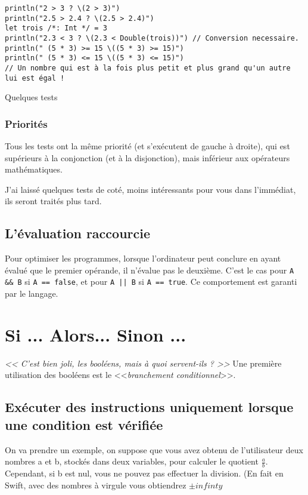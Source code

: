 \begin{listing}[h]
\begin{verbatim}
println("2 > 3 ? \(2 > 3)")
println("2.5 > 2.4 ? \(2.5 > 2.4)")
let trois /*: Int */ = 3
println("2.3 < 3 ? \(2.3 < Double(trois))") // Conversion necessaire.
println(" (5 * 3) >= 15 \((5 * 3) >= 15)")
println(" (5 * 3) <= 15 \((5 * 3) <= 15)")
// Un nombre qui est à la fois plus petit et plus grand qu'un autre lui est égal !

\end{verbatim}
\caption{Quelques tests}
\end{listing}%
\subsubsection{Priorités}
Tous les tests ont la même priorité
(et s'exécutent de gauche à droite),
qui est supérieurs à la conjonction (et à la disjonction),
mais inférieur aux opérateurs mathématiques.



J'ai laissé quelques tests de coté, moins intéressants pour vous dans l'immédiat, ils seront traités plus tard.
\subsection{L'évaluation raccourcie}
Pour optimiser les programmes, lorsque l'ordinateur peut conclure en ayant évalué que le premier opérande, il n'évalue pas le deuxième. C'est le cas pour \texttt{A && B} si \texttt{A == false},
et pour \texttt{A || B} si \texttt{A == true}.
Ce comportement est garanti par le langage.
\section{Si ... Alors... Sinon ...}
\emph{<< C'est bien joli, les booléens, mais à quoi servent-ils ? >>}
Une première utilisation des booléens est le <<\emph{branchement conditionnel}>>.
\subsection{Exécuter des instructions uniquement lorsque une condition est vérifiée}
On va prendre un exemple, on suppose que vous avez obtenu de l'utilisateur deux nombres a et b, stockés dans deux variables, pour calculer le quotient $\frac{a}{b}$.
Cependant, si b est nul, vous ne pouvez pas effectuer la division. (En fait en Swift, avec des nombres à virgule vous obtiendrez $\pm infinty$

